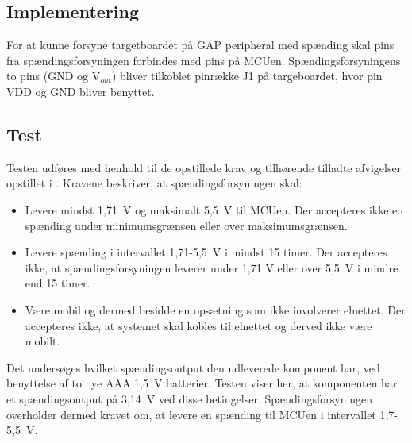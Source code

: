 \subsection{Implementering}
For at kunne forsyne targetboardet på GAP peripheral med spænding skal pins fra spændingsforsyningen forbindes med pins på MCUen. Spændingsforsyningens to pins (GND og V$_{out}$) bliver tilkoblet pinrække J1 på targeboardet, hvor pin VDD og GND bliver benyttet.

\subsection{Test} 
Testen udføres med henhold til de opstillede krav og tilhørende tilladte afvigelser opstillet i . Kravene beskriver, at spændingsforsyningen skal:
\begin{itemize}
	\item Levere mindst 1,71~V og maksimalt 5,5~V til MCUen. Der accepteres ikke en spænding under minimumsgrænsen eller over maksimumsgrænsen.
	\item Levere spænding i intervallet 1,71-5,5~V i mindst 15 timer. Der accepteres ikke, at spændingsforsyningen leverer under 1,71 V eller over 5,5~V i mindre end 15 timer.
	\item Være mobil og dermed besidde en opsætning som ikke involverer elnettet. Der accepteres ikke, at systemet skal kobles til elnettet og derved ikke være mobilt.
\end{itemize}
Det undersøges hvilket spændingsoutput den udleverede komponent har, ved benyttelse af to nye AAA 1,5~V batterier. Testen viser her, at komponenten har et spændingsoutput på 3,14~V ved disse betingelser.\newline
Spændingsforsyningen overholder dermed kravet om, at levere en spænding til MCUen i intervallet 1,7-5,5~V.





